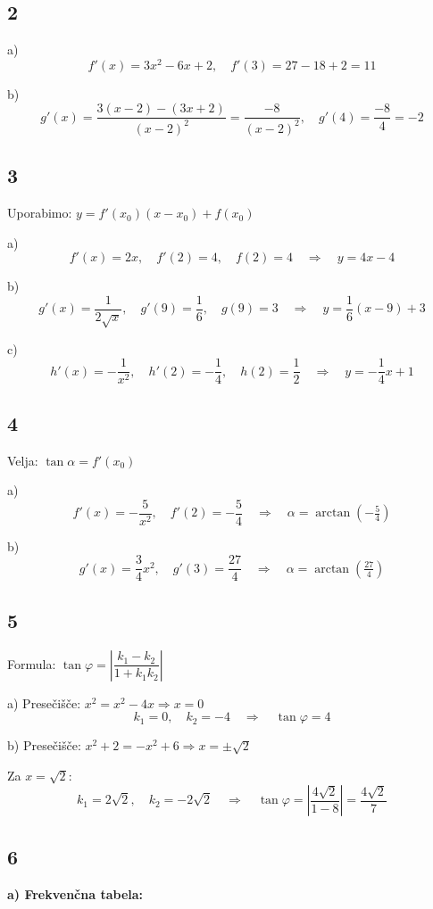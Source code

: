\documentclass[a4paper,12pt]{article}
\begin{document}
\subsection*{2}
a)
\[
f'(x)=3x^2-6x+2, \quad f'(3)=27-18+2=11
\]

b)
\[
g'(x)=\frac{3(x-2)-(3x+2)}{(x-2)^2}=\frac{-8}{(x-2)^2}, \quad g'(4)=\frac{-8}{4}=-2
\]

\subsection*{3}
Uporabimo: $y=f'(x_0)(x-x_0)+f(x_0)$

a)
\[
f'(x)=2x,\quad f'(2)=4,\quad f(2)=4 \quad\Rightarrow\quad y=4x-4
\]

b)
\[
g'(x)=\frac{1}{2\sqrt{x}},\quad g'(9)=\frac{1}{6},\quad g(9)=3 \quad\Rightarrow\quad y=\frac{1}{6}(x-9)+3
\]

c)
\[
h'(x)=-\frac{1}{x^2},\quad h'(2)=-\frac{1}{4},\quad h(2)=\frac{1}{2} \quad\Rightarrow\quad y=-\frac{1}{4}x+1
\]

\subsection*{4}
Velja: $\tan \alpha = f'(x_0)$

a)
\[
f'(x)=-\frac{5}{x^2},\quad f'(2)=-\frac{5}{4} \quad\Rightarrow\quad \alpha=\arctan\!\left(-\tfrac{5}{4}\right)
\]

b)
\[
g'(x)=\frac{3}{4}x^2,\quad g'(3)=\frac{27}{4} \quad\Rightarrow\quad \alpha=\arctan\!\left(\tfrac{27}{4}\right)
\]

\subsection*{5}
Formula: $\tan \varphi = \left|\dfrac{k_1-k_2}{1+k_1k_2}\right|$

a) Presečišče: $x^2=x^2-4x \Rightarrow x=0$
\[
k_1=0,\quad k_2=-4 \quad\Rightarrow\quad \tan \varphi = 4
\]

b) Presečišče: $x^2+2=-x^2+6 \Rightarrow x=\pm\sqrt{2}$

Za $x=\sqrt{2}$:
\[
k_1=2\sqrt{2},\quad k_2=-2\sqrt{2} \quad\Rightarrow\quad
\tan \varphi = \left|\frac{4\sqrt{2}}{1-8}\right|=\frac{4\sqrt{2}}{7}
\]

\subsection*{6}

\textbf{a) Frekvenčna tabela:}
\end{document}
